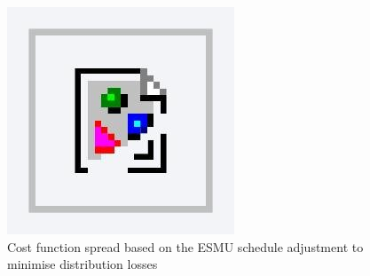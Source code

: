 \begin{figure}\centering
	\includegraphics{foo} %
	\caption{Cost function spread based on the ESMU schedule adjustment to minimise distribution losses}
\end{figure}